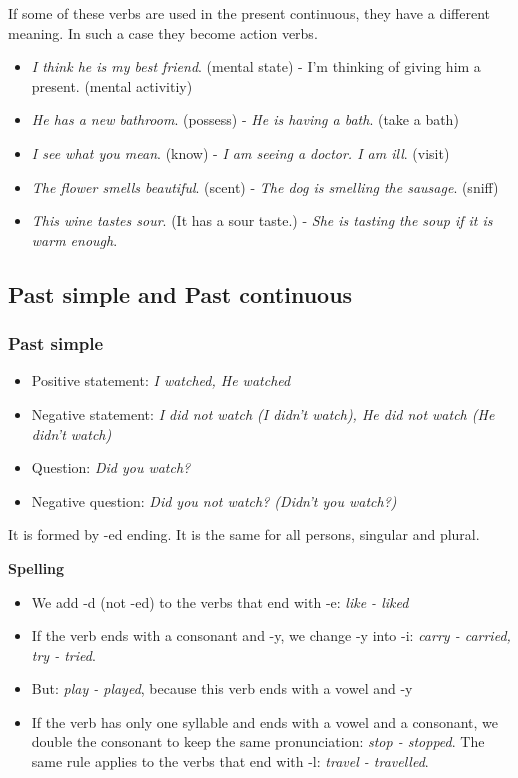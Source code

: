 If some of these verbs are used in the present continuous, they have a different meaning. In such a case they become action verbs.

\begin{itemize}

\item\textit{I think he is my best friend}. (mental state) - I'm thinking of giving him a present. (mental activitiy)
\item\textit{He has a new bathroom}. (possess) - \textit{He is having a bath}. (take a bath)
\item\textit{I see what you mean}. (know) - \textit{I am seeing a doctor. I am ill}. (visit)
\item\textit{The flower smells beautiful}. (scent) - \textit{The dog is smelling the sausage}. (sniff)
\item\textit{This wine tastes sour}. (It has a sour taste.) - \textit{She is tasting the soup if it is warm enough}.

\end{itemize}

\subsection{Past simple and Past continuous}

\subsubsection{Past simple}

\begin{itemize}

\item Positive statement: \textit{I watched, He watched}
\item Negative statement: \textit{I did not watch (I didn't watch), He did not watch (He didn't watch)}
\item Question: \textit{Did you watch?}
\item Negative question: \textit{Did you not watch? (Didn't you watch?)}

\end{itemize}

It is formed by -ed ending. It is the same for all persons, singular and plural.

\textbf{Spelling}

\begin{itemize}
\item We add -d (not -ed) to the verbs that end with -e: \textit{like - liked}
\item If the verb ends with a consonant and -y, we change -y into -i: \textit{carry - carried, try - tried}.
\item But: \textit{play - played}, because this verb ends with a vowel and -y
\item If the verb has only one syllable and ends with a vowel and a consonant, we double the consonant to keep the same pronunciation: \textit{stop - stopped}. The same rule applies to the verbs that end with -l: \textit{travel - travelled}.

\end{itemize}

